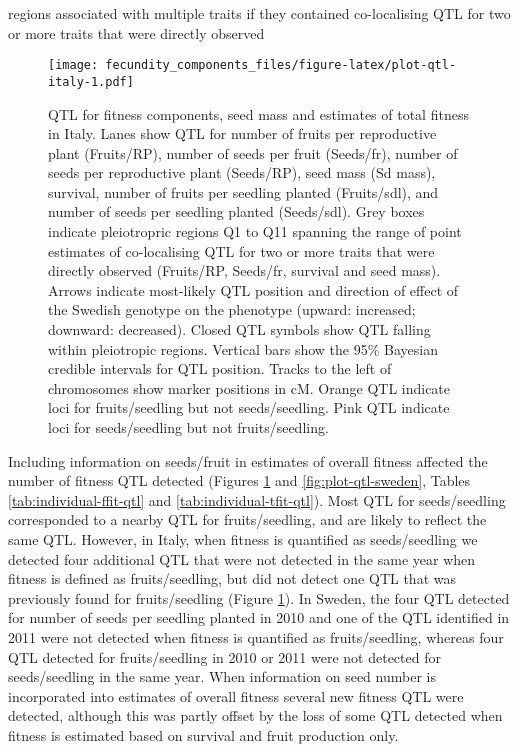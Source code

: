 \documentclass[
]{article}
\begin{document}
regions associated with multiple traits if they contained co-localising QTL for two or more traits that were directly observed

\begin{figure}
\centering
\texttt{[image: fecundity\_components\_files/figure-latex/plot-qtl-italy-1.pdf]}
\caption{\label{fig:plot-qtl-italy}QTL for fitness components, seed mass and estimates of total fitness in Italy. Lanes show QTL for number of fruits per reproductive plant (Fruits/RP), number of seeds per fruit (Seeds/fr), number of seeds per reproductive plant (Seeds/RP), seed mass (Sd mass), survival, number of fruits per seedling planted (Fruits/sdl), and number of seeds per seedling planted (Seeds/sdl). Grey boxes indicate pleiotropric regions Q1 to Q11 spanning the range of point estimates of co-localising QTL for two or more traits that were directly observed (Fruits/RP, Seeds/fr, survival and seed mass). Arrows indicate most-likely QTL position and direction of effect of the Swedish genotype on the phenotype (upward: increased; downward: decreased). Closed QTL symbols show QTL falling within pleiotropic regions. Vertical bars show the 95\% Bayesian credible intervals for QTL position. Tracks to the left of chromosomes show marker positions in cM. Orange QTL indicate loci for fruits/seedling but not seeds/seedling. Pink QTL indicate loci for seeds/seedling but not fruits/seedling.}
\end{figure}

Including information on seeds/fruit in estimates of overall fitness affected the number of fitness QTL detected (Figures \ref{fig:plot-qtl-italy} and \ref{fig:plot-qtl-sweden}, Tables \ref{tab:individual-ffit-qtl} and \ref{tab:individual-tfit-qtl}). Most QTL for seeds/seedling corresponded to a nearby QTL for fruits/seedling, and are likely to reflect the same QTL. However, in Italy, when fitness is quantified as seeds/seedling we detected four additional QTL that were not detected in the same year when fitness is defined as fruits/seedling, but did not detect one QTL that was previously found for fruits/seedling (Figure \ref{fig:plot-qtl-italy}). In Sweden, the four QTL detected for number of seeds per seedling planted in 2010 and one of the QTL identified in 2011 were not detected when fitness is quantified as fruits/seedling, whereas four QTL detected for fruits/seedling in 2010 or 2011 were not detected for seeds/seedling in the same year. When information on seed number is incorporated into estimates of overall fitness several new fitness QTL were detected, although this was partly offset by the loss of some QTL detected when fitness is estimated based on survival and fruit production only.
\end{document}
